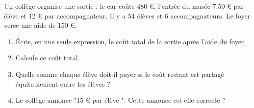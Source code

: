 \documentclass[12pt]{extarticle}
\begin{document}
{\begin{probbox}
    Un collège organise une sortie : le car coûte 480 €, l'entrée du musée 7,50 € par élève et 12 € par accompagnateur. Il y a 54 élèves et 6 accompagnateurs. Le foyer verse une aide de 150 €.
    \begin{enumerate}
        \item Écris, en une seule expression, le coût total de la sortie après
            l'aide du foyer. 
        \item Calcule ce coût total.
        \item Quelle somme chaque élève doit-il payer si le coût restant est 
            partagé équitablement entre les élèves ? 
        \item Le collège annonce "15 € par élève ". Cette annonce est-elle correcte ?
    \end{enumerate}
\end{probbox}

%
%

}   
\end{document}
